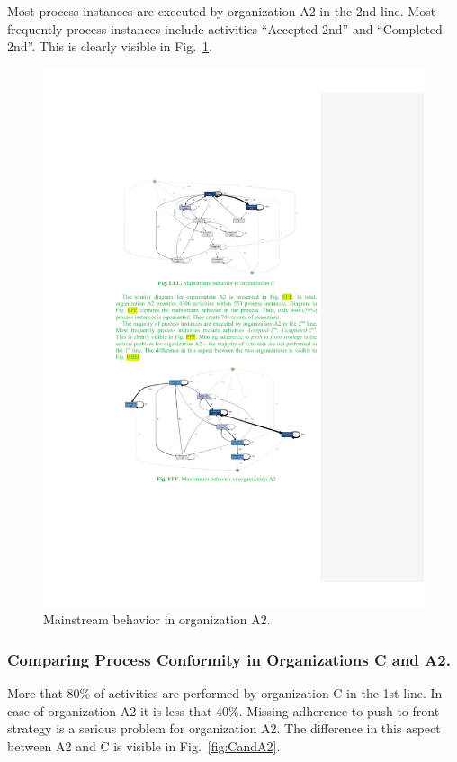 \documentclass[lnbip]{svmultln}
\begin{document}
Most process instances are executed by organization A2 in the 2nd line. Most frequently process instances include activities ``Accepted-2nd'' and ``Completed-2nd''. This is clearly visible in Fig.~\ref{fig:behaviorInA2}. 
 
\begin{figure}
  \begin{center}
    \includegraphics[width=.8\textwidth]{"figs/pic 37"}
  \end{center}
  \caption{Mainstream behavior in organization A2.}
  \label{fig:behaviorInA2}
\end{figure}

\subsubsection{Comparing Process Conformity in Organizations C and A2.}

More that 80\% of activities are performed by organization C in the 1st line. In case of organization A2 it is less that 40\%. Missing adherence to push to front strategy is a serious problem for organization A2. The difference in this aspect between A2 and C is visible in Fig.~\ref{fig:CandA2}.
 
\end{document}
